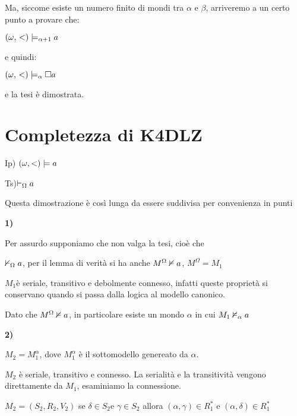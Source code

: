 Ma, siccome esiste un numero finito di mondi tra $\alpha$ e $\beta$,
arriveremo a un certo punto a provare che:

$(\omega,\,<)\models_{\alpha+1}a$

e quindi:

$(\omega,\,<)\models_{\alpha}\square a$

\begin{center} 
\end{center}

e la tesi è dimostrata.


\section{Completezza di K4DLZ}

Ip) $(\omega,<)\models a$

Ts)$\vdash_{\Omega}a$ 

Questa dimostrazione è così lunga da essere suddivisa per convenienza
in punti

\textbf{1)}

Per assurdo supponiamo che non valga la tesi, cioè che 

$\nvdash_{\Omega}a$, per il lemma di verità si ha anche $M^{\Omega}\nvDash a$,
$M^{\Omega}=M_{1}$

$M_{1}$è seriale, transitivo e debolmente connesso, infatti queste
proprietà si conservano quando si passa dalla logica al modello canonico.

Dato che $M^{\Omega}\nvDash a$, in particolare esiste un mondo
$\alpha$ in cui $M_{1}\nvDash_{\alpha}a$

\textbf{2)}

$M_{2}=M_{1}^{\alpha}$, dove $M_{1}^{\alpha}$ è il sottomodello
genereato da $\alpha$.

$M_{2}$ è seriale, transitivo e connesso. La serialità e la transitività
vengono direttamente da $M_{1}$, esaminiamo la connessione.

$M_{2}=(S_{2},R_{2},V_{2})$ se $\delta\in S_{2}$e $\gamma\in S_{2}$
allora $(\alpha,\gamma)\in R_{1}^{*}$ e $(\alpha,\delta)\in R_{1}^{*}$

